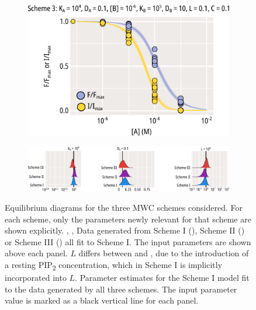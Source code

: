\begin{figure}[hbtp]
\begin{subfigure}[t]{0.3\textwidth}
	\end{subfigure}
	\hfill
	\begin{subfigure}[t]{0.3\textwidth}
		\caption{}\label{ch4fig:mwc_scheme_3_fits}
		\centering
		\includegraphics[width=\textwidth]{mwc_scheme_3_fits.pdf}
	\end{subfigure}
	\vfill
	\begin{subfigure}[t]{0.9\textwidth}
		\caption{}\label{ch4fig:mwc_params_1}
		\centering
		\includegraphics[width=\textwidth]{mwc_scheme_param_fits.pdf}
	\end{subfigure}
	\caption[Generating data from MWC model schemes]{
	{\bf{}}
	 Equilibrium diagrams for the three MWC schemes considered.
	For each scheme, only the parameters newly relevant for that scheme are shown explicitly.
	, ,  Data generated from Scheme I (), Scheme II () or Scheme III () all fit to Scheme I.
	The input parameters are shown above each panel.
	$L$ differs between  and ,  due to the introduction of a resting PIP\textsubscript{2} concentration, which in Scheme I is implicitly incorporated into $L$.
	 Parameter estimates for the Scheme I model fit to the data generated by all three schemes.
	The input parameter value is marked as a black vertical line for each panel.
	}\label{ch4fig:mwc_models}
\end{figure}

